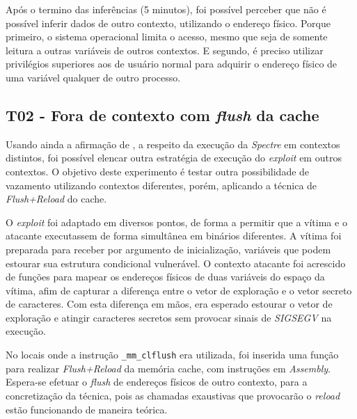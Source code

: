 \documentclass[
	article,			    %
	12pt,				    %
	oneside,			    %
	a4paper,			    %
	chapter=TITLE,		    %
	section=TITLE,		    %
	subsection=TITLE,	    %
	english,			    %
	brazil,				    %
	sumario=tradicional
]{abntex2}
\begin{document}
Após o termino das inferências (5 minutos), foi possível perceber que não é possível inferir dados de outro contexto, utilizando o endereço físico. Porque primeiro, o sistema operacional limita o acesso, mesmo que seja de somente leitura a outras variáveis de outros contextos. E segundo, é preciso utilizar privilégios superiores aos de usuário normal para adquirir o endereço físico de uma variável qualquer de outro processo.

\begin{comment}
https://www.eqware.net/articles/CapturingProcessMemoryUsageUnderLinux/index.html
https://stackoverflow.com/questions/5748492/is-there-any-api-for-determining-the-physical-address-from-virtual-address-in-li/45128487#45128487
\end{comment}

\subsection{T02 - Fora de contexto com \emph{flush} da cache}
Usando ainda a afirmação de , a respeito da execução da \emph{Spectre} em contextos distintos, foi possível elencar outra estratégia de execução do \emph{exploit} em outros contextos. O objetivo deste experimento é testar outra possibilidade de vazamento utilizando contextos diferentes, porém, aplicando a técnica de \emph{Flush+Reload} do cache.

O \emph{exploit} foi adaptado em diversos pontos, de forma a permitir que a vítima e o atacante executassem de forma simultânea em binários diferentes. A vítima foi preparada para receber por argumento de inicialização, variáveis que podem estourar sua estrutura condicional vulnerável. O contexto atacante foi acrescido de funções para mapear os endereços físicos de duas variáveis do espaço da vítima, afim de capturar a diferença entre o vetor de exploração e o vetor secreto de caracteres. Com esta diferença em mãos, era esperado estourar o vetor de exploração e atingir caracteres secretos sem provocar sinais de \emph{SIGSEGV} na execução.

No locais onde a instrução \lstinline[language=C, style=c]{_mm_clflush} era utilizada, foi inserida uma função para realizar \emph{Flush+Reload} da memória cache, com instruções em \emph{Assembly}. Espera-se efetuar o \emph{flush} de endereços físicos de outro contexto, para a concretização da técnica, pois as chamadas exaustivas que provocarão o \emph{reload} estão funcionando de maneira teórica.
\end{document}
